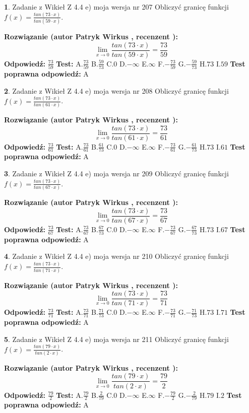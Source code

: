 \documentclass[12pt, a4paper]{article}
\theoremstyle{definition} %
\newtheorem{zad}{}
\newcommand{\zadStart}[1]{\begin{zad}#1\newline}
\newcommand{\zadStop}{\end{zad}}
\newcommand{\rozwStart}[2]{\noindent \textbf{Rozwiązanie (autor #1 , recenzent #2): }\newline}
\newcommand{\rozwStop}{\newline}
\newcommand{\odpStart}{\noindent \textbf{Odpowiedź:}\newline}
\newcommand{\odpStop}{\newline}
\newcommand{\testStart}{\noindent \textbf{Test:}\newline}
\newcommand{\testStop}{\newline}
\newcommand{\kluczStart}{\noindent \textbf{Test poprawna odpowiedź:}\newline}
\newcommand{\kluczStop}{\newline}
\begin{document}
\zadStart{Zadanie z Wikieł Z 4.4 e) moja wersja nr 207}
Obliczyć granicę funkcji $f(x)=\frac{tan(73\cdot x)}{tan(59\cdot x)}$.
\zadStop
\rozwStart{Patryk Wirkus}{}
$$\lim\limits_{x\to 0}\frac{tan(73\cdot x)}{tan(59\cdot x)}=
\frac{73}{59}$$
\rozwStop
\odpStart
$\frac{73}{59}$
\odpStop
\testStart
A.$\frac{73}{59}$
B.$\frac{59}{73}$
C.$0$
D.$-\infty$
E.$\infty$
F.$-\frac{73}{59}$
G.$-\frac{59}{73}$
H.$73$
I.$59$
\testStop
\kluczStart
A
\kluczStop



\zadStart{Zadanie z Wikieł Z 4.4 e) moja wersja nr 208}
Obliczyć granicę funkcji $f(x)=\frac{tan(73\cdot x)}{tan(61\cdot x)}$.
\zadStop
\rozwStart{Patryk Wirkus}{}
$$\lim\limits_{x\to 0}\frac{tan(73\cdot x)}{tan(61\cdot x)}=
\frac{73}{61}$$
\rozwStop
\odpStart
$\frac{73}{61}$
\odpStop
\testStart
A.$\frac{73}{61}$
B.$\frac{61}{73}$
C.$0$
D.$-\infty$
E.$\infty$
F.$-\frac{73}{61}$
G.$-\frac{61}{73}$
H.$73$
I.$61$
\testStop
\kluczStart
A
\kluczStop



\zadStart{Zadanie z Wikieł Z 4.4 e) moja wersja nr 209}
Obliczyć granicę funkcji $f(x)=\frac{tan(73\cdot x)}{tan(67\cdot x)}$.
\zadStop
\rozwStart{Patryk Wirkus}{}
$$\lim\limits_{x\to 0}\frac{tan(73\cdot x)}{tan(67\cdot x)}=
\frac{73}{67}$$
\rozwStop
\odpStart
$\frac{73}{67}$
\odpStop
\testStart
A.$\frac{73}{67}$
B.$\frac{67}{73}$
C.$0$
D.$-\infty$
E.$\infty$
F.$-\frac{73}{67}$
G.$-\frac{67}{73}$
H.$73$
I.$67$
\testStop
\kluczStart
A
\kluczStop



\zadStart{Zadanie z Wikieł Z 4.4 e) moja wersja nr 210}
Obliczyć granicę funkcji $f(x)=\frac{tan(73\cdot x)}{tan(71\cdot x)}$.
\zadStop
\rozwStart{Patryk Wirkus}{}
$$\lim\limits_{x\to 0}\frac{tan(73\cdot x)}{tan(71\cdot x)}=
\frac{73}{71}$$
\rozwStop
\odpStart
$\frac{73}{71}$
\odpStop
\testStart
A.$\frac{73}{71}$
B.$\frac{71}{73}$
C.$0$
D.$-\infty$
E.$\infty$
F.$-\frac{73}{71}$
G.$-\frac{71}{73}$
H.$73$
I.$71$
\testStop
\kluczStart
A
\kluczStop



\zadStart{Zadanie z Wikieł Z 4.4 e) moja wersja nr 211}
Obliczyć granicę funkcji $f(x)=\frac{tan(79\cdot x)}{tan(2\cdot x)}$.
\zadStop
\rozwStart{Patryk Wirkus}{}
$$\lim\limits_{x\to 0}\frac{tan(79\cdot x)}{tan(2\cdot x)}=
\frac{79}{2}$$
\rozwStop
\odpStart
$\frac{79}{2}$
\odpStop
\testStart
A.$\frac{79}{2}$
B.$\frac{2}{79}$
C.$0$
D.$-\infty$
E.$\infty$
F.$-\frac{79}{2}$
G.$-\frac{2}{79}$
H.$79$
I.$2$
\testStop
\kluczStart
A
\kluczStop
\end{document}
